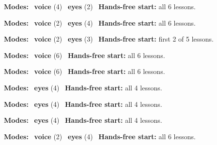 \expandafter\def\csname hlchaptermodality6\endcsname{%
  {\small\noindent
    \textbf{Modes:} \hlvoicesign{}~\textbf{voice} (4) \quad \hlsightsign{}~\textbf{eyes} (2)\quad
    \hlvoicesign{}~\textbf{Hands-free start:} all 6 lessons.%
    \par}\medskip
}

\expandafter\def\csname hlchaptermodality7\endcsname{%
  {\small\noindent
    \textbf{Modes:} \hlvoicesign{}~\textbf{voice} (2) \quad \hlsightsign{}~\textbf{eyes} (4)\quad
    \hlvoicesign{}~\textbf{Hands-free start:} all 6 lessons.%
    \par}\medskip
}

\expandafter\def\csname hlchaptermodality8\endcsname{%
  {\small\noindent
    \textbf{Modes:} \hlvoicesign{}~\textbf{voice} (2) \quad \hlsightsign{}~\textbf{eyes} (3)\quad
    \hlvoicesign{}~\textbf{Hands-free start:} first 2 of 5 lessons.%
    \par}\medskip
}

\expandafter\def\csname hlchaptermodality9\endcsname{%
  {\small\noindent
    \textbf{Modes:} \hlvoicesign{}~\textbf{voice} (6)\quad
    \hlvoicesign{}~\textbf{Hands-free start:} all 6 lessons.%
    \par}\medskip
}

\expandafter\def\csname hlchaptermodality10\endcsname{%
  {\small\noindent
    \textbf{Modes:} \hlvoicesign{}~\textbf{voice} (6)\quad
    \hlvoicesign{}~\textbf{Hands-free start:} all 6 lessons.%
    \par}\medskip
}

\expandafter\def\csname hlchaptermodality11\endcsname{%
  {\small\noindent
    \textbf{Modes:} \hlsightsign{}~\textbf{eyes} (4)\quad
    \hlvoicesign{}~\textbf{Hands-free start:} all 4 lessons.%
    \par}\medskip
}

\expandafter\def\csname hlchaptermodality12\endcsname{%
  {\small\noindent
    \textbf{Modes:} \hlsightsign{}~\textbf{eyes} (4)\quad
    \hlvoicesign{}~\textbf{Hands-free start:} all 4 lessons.%
    \par}\medskip
}

\expandafter\def\csname hlchaptermodality13\endcsname{%
  {\small\noindent
    \textbf{Modes:} \hlsightsign{}~\textbf{eyes} (4)\quad
    \hlvoicesign{}~\textbf{Hands-free start:} all 4 lessons.%
    \par}\medskip
}

\expandafter\def\csname hlchaptermodality14\endcsname{%
  {\small\noindent
    \textbf{Modes:} \hlvoicesign{}~\textbf{voice} (2) \quad \hlsightsign{}~\textbf{eyes} (4)\quad
    \hlvoicesign{}~\textbf{Hands-free start:} all 6 lessons.%
    \par}\medskip
}


